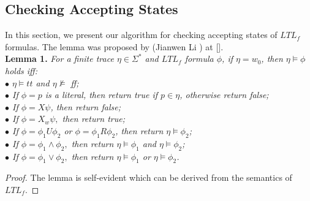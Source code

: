 \subsection{Checking Accepting States}  
In this section, we present our algorithm for checking accepting states of $LTL_f$ formulas. The lemma  was proposed by (Jianwen Li ) at [].  \\

{\bf Lemma 1.}  {\it For a finite trace $\eta \in \Sigma^{*}$ and $LTL_f$ formula $\phi$, if $\eta = w_0$, then $\eta \models \phi$ holds iff: \\ 
$\bullet$ $\eta \models tt$ and $\eta \not \models $ ff;\\
$\bullet$ If $\phi=p$ is a literal, then return true if $p \in \eta$, otherwise return false;\\
$\bullet$ If $\phi=X \psi$, then return false;\\
$\bullet$ If $\phi=X_{w} \psi,$ then return true;\\
$\bullet$ If $\phi=\phi_{1} U \phi_{2}$ or  $\phi=\phi_{1} R \phi_{2}$, then return  $\eta \models \phi_{2}$; \\
$\bullet$ If $\phi=\phi_{1} \wedge \phi_{2},$ then return $\eta \models \phi_{1}$ and $\eta \models \phi_{2}$; \\
$\bullet$ If $\phi=\phi_{1} \vee \phi_{2},$ then return $\eta \models \phi_{1}$ or $\eta \models \phi_{2}$.}

\begin{proof}
The lemma is self-evident which can be derived from the semantics of $LTL_f$.
\end{proof}

